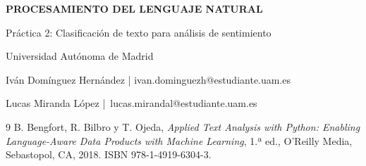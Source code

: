 \documentclass[10pt,a4paper]{article}
\begin{document}
\begin{titlepage}
    \centering
    \vfill
    {\huge \textbf{PROCESAMIENTO DEL LENGUAJE NATURAL} \par}
    \vspace{2cm}
    {\Large Práctica 2: Clasificación de texto para análisis de sentimiento \par}
    \vspace{1cm}
    {\Large Universidad Autónoma de Madrid \par}
    \vspace{1cm}
    {\large Iván Domínguez Hernández |  ivan.dominguezh@estudiante.uam.es \par}
    \vspace{.5cm}
    {\large Lucas Miranda López | lucas.mirandal@estudiante.uam.es \par}
    \vspace{1cm}
\end{titlepage}


\tableofcontents

\newpage

\begin{thebibliography}{9}
B. Bengfort, R. Bilbro y T. Ojeda,
\textit{Applied Text Analysis with Python: Enabling Language-Aware Data Products with Machine Learning},
1.ª ed., O'Reilly Media, Sebastopol, CA, 2018. ISBN 978-1-4919-6304-3.

\end{thebibliography}
\end{document}
